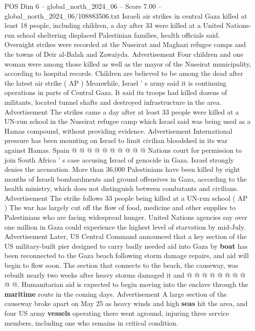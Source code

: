 \begin{textsample}{POS Dim 6 – global\_north\_2024\_06 – Score 7.00 – global\_north\_2024\_06/108883506.txt}  \label{ex:f6_pos_143}
Israeli air strikes in central Gaza killed at least 18 people, including children, a day after 33 were killed at a United Nations-run school sheltering displaced Palestinian families, health officials said.
Overnight strikes were recorded at the Nuseirat and Maghazi refugee camps and the towns of Deir al-Balah and Zawaiyda.
Advertisement Four children and one woman were among those killed as well as the mayor of the Nuseirat municipality, according to hospital records.
Children are believed to be among the dead after the latest air strike ( AP ) Meanwhile, Israel ' s army said it is continuing operations in parts of Central Gaza.
It said its troops had killed dozens of militants, located tunnel shafts and destroyed infrastructure in the area.
Advertisement The strikes came a day after at least 33 people were killed at a UN-run school in the Nuseirat refugee camp which Israel said was being used as a Hamas compound, without providing evidence.
Advertisement International pressure has been mounting on Israel to limit civilian bloodshed in its war against Hamas.
Spain @ @ @ @ @ @ @ @ @ @ Nations court for permission to join South Africa ' s case accusing Israel of genocide in Gaza.
Israel strongly denies the accusation.
More than 36,000 Palestinians have been killed by eight months of Israeli bombardments and ground offensives in Gaza, according to the health ministry, which does not distinguish between combatants and civilians.
Advertisement The strike follows 33 people being killed at a UN-run school ( AP ) The war has largely cut off the flow of food, medicine and other supplies to Palestinians who are facing widespread hunger.
United Nations agencies say over one million in Gaza could experience the highest level of starvation by mid-July.
Advertisement Later, US Central Command announced that a key section of the US military-built pier designed to carry badly needed aid into Gaza by \textbf{boat} has been reconnected to the Gaza beach following storm damage repairs, and aid will begin to flow soon.
The section that connects to the beach, the causeway, was rebuilt nearly two weeks after heavy storms damaged it and @ @ @ @ @ @ @ @ @ @.
Humanitarian aid is expected to begin moving into the enclave through the \textbf{maritime} route in the coming days.
Advertisement A large section of the causeway broke apart on May 25 as heavy winds and high \textbf{seas} hit the area, and four US army \textbf{vessels} operating there went aground, injuring three service members, including one who remains in critical condition.

\end{textsample}
